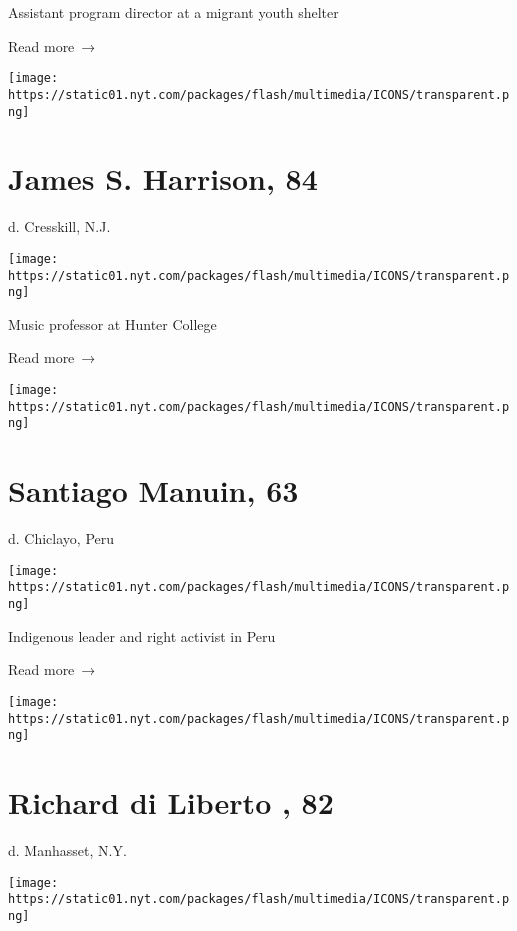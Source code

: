 Assistant program director at a migrant youth shelter

 Read more~→

\href{https://www.nytimes.com/2020/07/09/obituaries/james-harrison-dead-coronavirus.html}{}

\texttt{[image: https://static01.nyt.com/packages/flash/multimedia/ICONS/transparent.png]}

\hypertarget{james-s-harrison-84}{%
\section{James S. Harrison, 84}\label{james-s-harrison-84}}

d. Cresskill, N.J.

\texttt{[image: https://static01.nyt.com/packages/flash/multimedia/ICONS/transparent.png]}

Music professor at Hunter College

 Read more~→

\href{https://www.nytimes.com/2020/07/08/world/americas/santiago-manuin-dead-coronavirus.html}{}

\texttt{[image: https://static01.nyt.com/packages/flash/multimedia/ICONS/transparent.png]}

\hypertarget{santiago-manuin-63}{%
\section{Santiago Manuin, 63}\label{santiago-manuin-63}}

d. Chiclayo, Peru

\texttt{[image: https://static01.nyt.com/packages/flash/multimedia/ICONS/transparent.png]}

Indigenous leader and right activist in Peru

 Read more~→

\href{https://www.nytimes.com/2020/07/07/obituaries/richard-di-liberto-dead-coronavirus.html}{}

\texttt{[image: https://static01.nyt.com/packages/flash/multimedia/ICONS/transparent.png]}

\hypertarget{richard-di-liberto--82}{%
\section{Richard di Liberto , 82}\label{richard-di-liberto--82}}

d. Manhasset, N.Y.

\texttt{[image: https://static01.nyt.com/packages/flash/multimedia/ICONS/transparent.png]}

